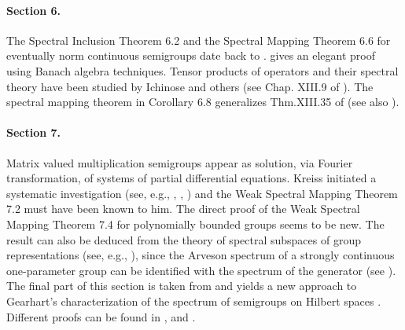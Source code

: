 \paragraph{Section 6.} The Spectral Inclusion Theorem 6.2 and the Spectral Mapping Theorem 6.6 for eventually norm continuous semigroups date back to \citet{hillephillips:1957}.
\citet{davies:1980} gives an elegant proof using Banach algebra techniques.
Tensor products of operators and their spectral theory have been studied by Ichinose and others (see Chap. XIII.9 of \citet{reedsimon:1978}).
The spectral mapping theorem in Corollary 6.8 generalizes Thm.XIII.35 of \citet{reedsimon:1978} (see also \citet{herbst:1982}).

\paragraph{Section 7.} Matrix valued multiplication semigroups appear as solution, via Fourier transformation, of systems of partial differential equations.
Kreiss initiated a systematic investigation (see, e.g., \citet{kreiss:1958}, \citet{kreiss:1959}, \citet{millerstrang:1966}) and the Weak Spectral Mapping Theorem 7.2 must have been known to him. The direct proof of the Weak Spectral Mapping Theorem 7.4 for polynomially bounded groups seems to be new. The result can also be deduced from the theory of spectral subspaces of group representations (see, e.g., \citet{combesdelaroche:1978}), since the Arveson spectrum of a strongly continuous one-parameter group can be identified with the spectrum of the generator (see \citet{evans:1976}). The final part of this section is taken from \citet{greiner:1985} and yields a new approach to Gearhart's characterization of the spectrum of semigroups on Hilbert spaces \citet{gearhart:1978}. Different proofs can be found in \citet{herbst:1983}, \citet{howland:1984} and \citet{pruess:1984}. %



